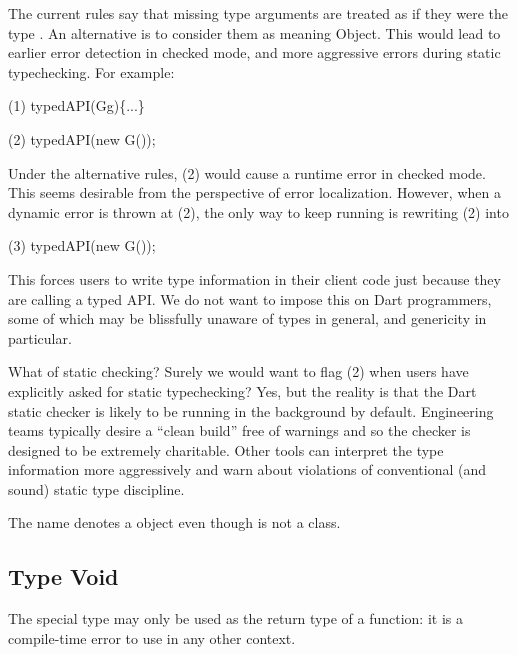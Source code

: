 \documentclass{article}
\newcommand{\code}[1]{{\sf #1}}
\begin{document}
\begin{itemize}
{The current rules say that missing type arguments are treated as if they were the type  \DYNAMIC{}.  An alternative is to consider them as meaning \code{Object}.  This would lead to earlier error detection in checked mode, and more aggressive errors during static typechecking. For example:

(1)  \code{typedAPI(G\gt g)\{...\}}


(2)  \code{typedAPI(new G()); }


Under the alternative rules, (2) would cause a runtime error in checked mode. This seems desirable from the perspective of error localization. However, when a dynamic error is thrown at (2), the only way to keep running is rewriting (2) into

(3) \code{typedAPI(new G\gt());}

This forces users to write type information in their client code just because they are calling a typed API.  We do not want to impose this on Dart programmers, some of which may be blissfully unaware of types in general, and genericity in particular.

What of static checking? Surely we would want to flag (2) when users have explicitly asked for static typechecking? Yes, but the reality is that the Dart static checker is likely to be running in the background by default. Engineering teams typically desire a ``clean build'' free of warnings and so the checker is designed to be extremely charitable. Other tools can interpret the type information more aggressively and warn about violations of conventional (and sound) static type discipline.
}

\LMHash{}
The name \DYNAMIC{} denotes a  object even though \DYNAMIC{} is not a class.


\subsection{Type Void}

\LMHash{}
The special type \VOID{} may only be used as the return type of a function: it is a compile-time error to use \VOID{} in any other context.

\end{itemize}
\end{document}
